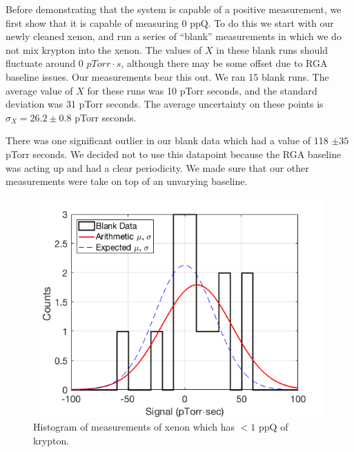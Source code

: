 \documentclass[12pt]{article}
\begin{document}
Before demonstrating that the system is capable of a positive measurement, we first show that it is capable of measuring 0 ppQ. To do this we start with our newly cleaned xenon, and run a series of ``blank'' measurements in which we do not mix krypton into the xenon. The values of $X$ in these blank runs should fluctuate around 0 $pTorr\cdot s$, although there may be some offset due to RGA baseline issues. Our measurements bear this out. We ran 15 blank runs. The average value of $X$ for these runs was 10 pTorr seconds, and the standard deviation was 31 pTorr seconds. The average uncertainty on these points is $\sigma_X=26.2\pm0.8$ pTorr seconds.

There was one significant outlier in our blank data which had a value of 118 $\pm35$ pTorr seconds. We decided not to use this datapoint because the RGA baseline was acting up and had a clear periodicity. We made sure that our other measurements were take on top of an unvarying baseline.
\begin{figure}[h!]
  \includegraphics[width=\linewidth]{Figures/BlankHist0217.png}
  \caption{Histogram of measurements of xenon which has $<1$ ppQ of  krypton.}
  \label{fig:senstrace}
\end{figure}
\end{document}
